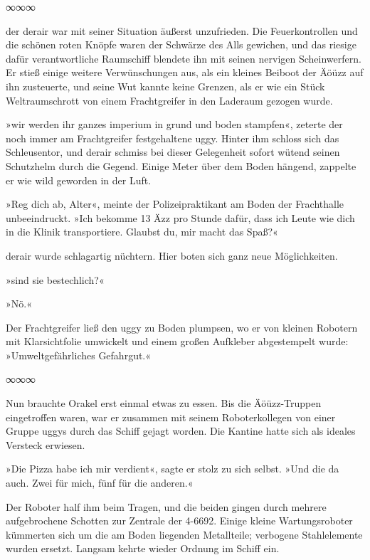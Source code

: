 \begin{center}
    ∞∞∞
\end{center}

der derair war mit seiner Situation äußerst unzufrieden. Die Feuerkontrollen und die schönen roten Knöpfe waren der Schwärze des Alls gewichen, und das riesige dafür verantwortliche Raumschiff blendete ihn mit seinen nervigen Scheinwerfern. Er stieß einige weitere Verwünschungen aus, als ein kleines Beiboot der Äöüzz auf ihn zusteuerte, und seine Wut kannte keine Grenzen, als er wie ein Stück Weltraumschrott von einem Frachtgreifer in den Laderaum gezogen wurde.

»wir werden ihr ganzes imperium in grund und boden stampfen«, zeterte der noch immer am Frachtgreifer festgehaltene uggy. Hinter ihm schloss sich das Schleusentor, und derair schmiss bei dieser Gelegenheit sofort wütend seinen Schutzhelm durch die Gegend. Einige Meter über dem Boden hängend, zappelte er wie wild geworden in der Luft.

»Reg dich ab, Alter«, meinte der Polizeipraktikant am Boden der Frachthalle unbeeindruckt. »Ich bekomme 13 Äzz pro Stunde dafür, dass ich Leute wie dich in die Klinik transportiere. Glaubst du, mir macht das Spaß?«

derair wurde schlagartig nüchtern. Hier boten sich ganz neue Möglichkeiten.

»sind sie bestechlich?«

»Nö.«

Der Frachtgreifer ließ den uggy zu Boden plumpsen, wo er von kleinen Robotern mit Klarsichtfolie umwickelt und einem großen Aufkleber abgestempelt wurde: »Umweltgefährliches Gefahrgut.«

\begin{center}
    ∞∞∞
\end{center}

Nun brauchte Orakel erst einmal etwas zu essen. Bis die Äöüzz-Truppen eingetroffen waren, war er zusammen mit seinem Roboterkollegen von einer Gruppe uggys durch das Schiff gejagt worden. Die Kantine hatte sich als ideales Versteck erwiesen.

»Die Pizza habe ich mir verdient«, sagte er stolz zu sich selbst. »Und die da auch. Zwei für mich, fünf für die anderen.«

Der Roboter half ihm beim Tragen, und die beiden gingen durch mehrere aufgebrochene Schotten zur Zentrale der 4-6692. Einige kleine Wartungsroboter kümmerten sich um die am Boden liegenden Metallteile; verbogene Stahlelemente wurden ersetzt. Langsam kehrte wieder Ordnung im Schiff ein.

